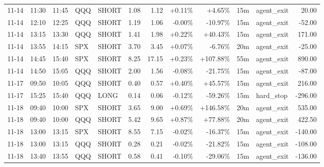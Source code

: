 \documentclass[11pt,a4paper]{article}
\begin{document}
\begin{center}
\begin{longtable}{>{\color{txtmain}}l l l l l r r r r r >{\color{txtmain}}l r}
11-14 & 11:30 & 11:45 & QQQ & SHORT & 1.08 & 1.12 & \textcolor{wingreen}{+0.11\%} & \textcolor{wingreen}{+4.65\%} & 15m & agent\_exit & \textcolor{wingreen}{20.00} \\
11-14 & 12:10 & 12:25 & QQQ & SHORT & 1.19 & 1.06 & \textcolor{wingreen}{-0.00\%} & \textcolor{lossred}{-10.97\%} & 15m & agent\_exit & \textcolor{lossred}{-52.00} \\
11-14 & 13:15 & 13:30 & QQQ & SHORT & 1.41 & 1.98 & \textcolor{wingreen}{+0.22\%} & \textcolor{wingreen}{+40.43\%} & 15m & agent\_exit & \textcolor{wingreen}{171.00} \\
11-14 & 13:55 & 14:15 & SPX & SHORT & 3.70 & 3.45 & \textcolor{wingreen}{+0.07\%} & \textcolor{lossred}{-6.76\%} & 20m & agent\_exit & \textcolor{lossred}{-25.00} \\
11-14 & 14:45 & 15:40 & SPX & SHORT & 8.25 & 17.15 & \textcolor{wingreen}{+0.23\%} & \textcolor{wingreen}{+107.88\%} & 55m & agent\_exit & \textcolor{wingreen}{890.00} \\
11-14 & 14:50 & 15:05 & QQQ & SHORT & 2.00 & 1.56 & \textcolor{lossred}{-0.08\%} & \textcolor{lossred}{-21.75\%} & 15m & agent\_exit & \textcolor{lossred}{-87.00} \\
11-17 & 09:50 & 10:05 & QQQ & SHORT & 0.40 & 0.57 & \textcolor{wingreen}{+0.40\%} & \textcolor{wingreen}{+45.57\%} & 15m & agent\_exit & \textcolor{wingreen}{216.00} \\
11-17 & 15:25 & 15:40 & QQQ & LONG & 0.14 & 0.06 & \textcolor{lossred}{-0.12\%} & \textcolor{lossred}{-59.26\%} & 15m & hard\_stop & \textcolor{lossred}{-296.00} \\
11-18 & 09:40 & 10:00 & SPX & SHORT & 3.65 & 9.00 & \textcolor{wingreen}{+0.69\%} & \textcolor{wingreen}{+146.58\%} & 20m & agent\_exit & \textcolor{wingreen}{535.00} \\
11-18 & 09:40 & 10:00 & QQQ & SHORT & 5.42 & 9.65 & \textcolor{wingreen}{+0.87\%} & \textcolor{wingreen}{+77.88\%} & 20m & agent\_exit & \textcolor{wingreen}{422.50} \\
11-18 & 13:00 & 13:15 & SPX & SHORT & 8.55 & 7.15 & \textcolor{lossred}{-0.02\%} & \textcolor{lossred}{-16.37\%} & 15m & agent\_exit & \textcolor{lossred}{-140.00} \\
11-18 & 13:00 & 13:15 & QQQ & SHORT & 0.28 & 0.21 & \textcolor{lossred}{-0.02\%} & \textcolor{lossred}{-21.82\%} & 15m & agent\_exit & \textcolor{lossred}{-108.00} \\
11-18 & 13:40 & 13:55 & QQQ & SHORT & 0.58 & 0.41 & \textcolor{lossred}{-0.10\%} & \textcolor{lossred}{-29.06\%} & 15m & agent\_exit & \textcolor{lossred}{-136.00} \\

\end{longtable}
\end{center}
\end{document}
